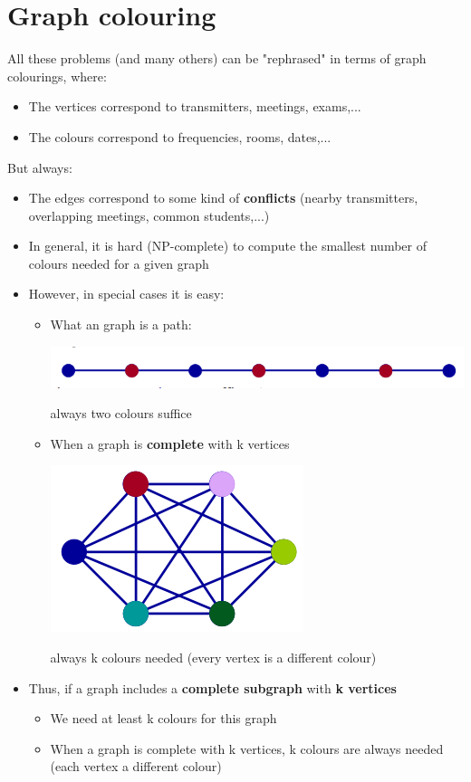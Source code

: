 \documentclass{article}[18pt]
\begin{document}
\section{Graph colouring}
All these problems (and many others) can be "rephrased" in terms of graph colourings, where:
\begin{itemize}
\item The vertices correspond to transmitters, meetings, exams,...
\item The colours correspond to frequencies, rooms, dates,...
\end{itemize}
But always:
\begin{itemize}
\item The edges correspond to some kind of \textbf{conflicts} (nearby transmitters, overlapping meetings, common students,...)
\end{itemize}
\begin{itemize}
\item In general, it is hard (NP-complete) to compute the smallest number of colours needed for a given graph
\item However, in special cases it is easy:
\begin{itemize}
\item What an graph is a path:
\begin{center}
\includegraphics[width=0.7\linewidth]{path}
\end{center}
always two colours suffice
\item When a graph is \textbf{complete} with k vertices
\begin{center}
\includegraphics[scale=0.7]{complete}
\end{center}
always k colours needed (every vertex is a different colour)
\end{itemize}
\item Thus, if a graph includes a \textbf{complete subgraph} with \textbf{k vertices}
\begin{itemize}
\item We need at least k colours for this graph
\item When a graph is complete with k vertices, k colours are always needed (each vertex a different colour)
\end{itemize}
\end{itemize}
\end{document}
